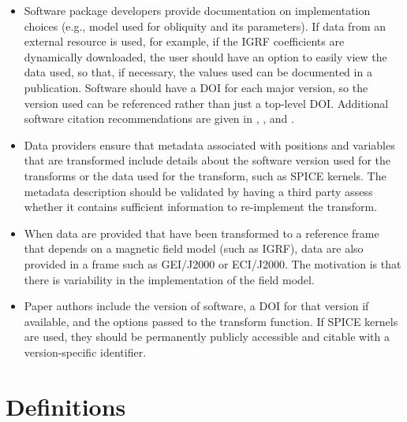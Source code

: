 \documentclass[draft]{agujournal2019}
\begin{document}
\begin{itemize}
  \item Software package developers provide documentation on implementation choices (e.g., model used for obliquity and its parameters). If data from an external resource is used, for example, if the IGRF coefficients are dynamically downloaded, the user should have an option to easily view the data used, so that, if necessary, the values used can be documented in a publication.
  Software should have a DOI for each major version, so the version used can be referenced rather than just a top-level DOI. Additional software citation recommendations are given in , , and \cite{Stall2023}.
  \item Data providers ensure that metadata associated with positions and variables that are transformed include details about the software version used for the transforms or the data used for the transform, such as SPICE kernels. The metadata description should be validated by having a third party assess whether it contains sufficient information to re-implement the transform.
  \item When data are provided that have been transformed to a reference frame that depends on a magnetic field model (such as IGRF), data are also provided in a frame such as GEI/J2000 or ECI/J2000. The motivation is that there is variability in the implementation of the field model. 
  \item Paper authors include the version of software, a DOI for that version if available, and the options passed to the transform function. If SPICE kernels are used, they should be permanently publicly accessible and citable with a version-specific identifier. 

\end{itemize}

\appendix
\section{Definitions}
\label{sect:glossary}
\end{document}
